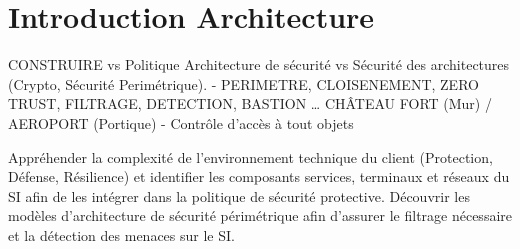 


\section{Introduction Architecture}

CONSTRUIRE vs Politique Architecture de sécurité vs Sécurité des architectures (Crypto, Sécurité Perimétrique). - PERIMETRE, CLOISENEMENT, ZERO TRUST, FILTRAGE, DETECTION, BASTION  … CHÂTEAU FORT (Mur) / AEROPORT (Portique) - Contrôle d'accès à tout objets

Appréhender la complexité de l'environnement technique du client (Protection, Défense, Résilience) et identifier les composants services, terminaux et réseaux du SI afin de les intégrer dans la politique de sécurité protective.
Découvrir les modèles d'architecture de sécurité périmétrique afin d'assurer le filtrage nécessaire et la détection des menaces sur le SI.




